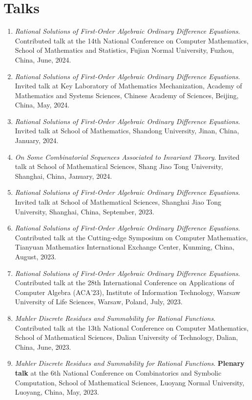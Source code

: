 \documentclass[a4paper,12pt]{article}
\begin{document}
\section*{\Large{Talks}}
\begin{enumerate}
\item {\em Rational Solutions of First-Order Algebraic Ordinary Difference Equations}. 
Contributed talk at the 14th National Conference on Computer Mathematics, School of Mathematics and Statistics, Fujian Normal University, Fuzhou, China, June, 2024.
\item {\em Rational Solutions of First-Order Algebraic Ordinary Difference Equations}. 
Invited talk at Key Laboratory of Mathematics Mechanization, Academy of Mathematics and Systems Sciences, Chinese Academy of Sciences, Beijing, China, May, 2024. 
\item {\em Rational Solutions of First-Order Algebraic Ordinary Difference Equations}. 
Invited talk at School of Mathematics, Shandong University, Jinan, China, January, 2024. 
\item {\em On Some Combinatorial Sequences Associated to Invariant Theory}. 
Invited talk at School of Mathematical Sciences, Shang Jiao Tong University, Shanghai, China, January, 2024. 
\item {\em Rational Solutions of First-Order Algebraic Ordinary Difference Equations}. 
Invited talk at School of Mathematical Sciences, Shanghai Jiao Tong University, Shanghai, China, September, 2023.
\item {\em Rational Solutions of First-Order Algebraic Ordinary Difference Equations}. 
Contributed talk at the Cutting-edge Symposium on Computer Mathematics, Tianyuan Mathematics International Exchange Center, Kunming, China, August, 2023.
\item {\em Rational Solutions of First-Order Algebraic Ordinary Difference Equations}. 
Contributed talk at the 28th International Conference on Applications of Computer Algebra (ACA'23), Institute of Information Technology, Warsaw University of Life Sciences, Warsaw, Poland, July, 2023.
\item {\em Mahler Discrete Residues and Summability for Rational Functions}. 
Contributed talk at the 13th National Conference on Computer Mathematics, School of Mathematical Sciences, Dalian University of Technology, Dalian, China, June, 2023. 
\item {\em Mahler Discrete Residues and Summability for Rational Functions}. 
\textbf{Plenary talk} at the 6th National Conference on Combinatorics and Symbolic Computation, School of Mathematical Sciences, Luoyang Normal University, Luoyang, China, May, 2023. 

\end{enumerate}
\end{document}
